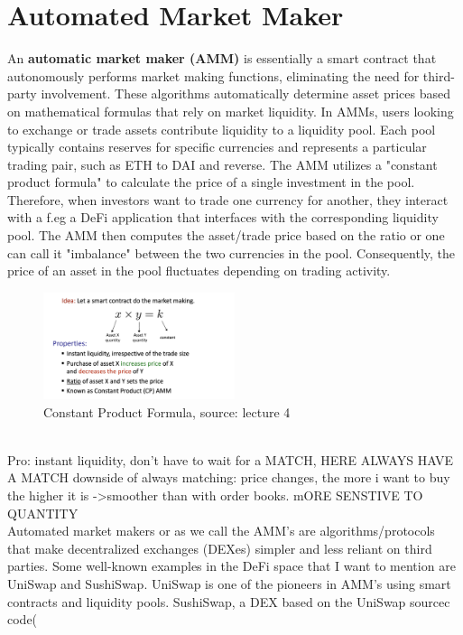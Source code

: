 \documentclass{article}
\begin{document}
\section{Automated Market Maker}
An \textbf{automatic market maker (AMM)} is essentially a smart contract that autonomously performs market making functions, eliminating the need for third-party involvement. These algorithms automatically determine asset prices based on mathematical formulas that rely on market liquidity. In AMMs, users looking to exchange or trade assets contribute liquidity to a liquidity pool. Each pool typically contains reserves for specific currencies and represents a particular trading pair, such as ETH to DAI and reverse. The AMM utilizes a "constant product formula" to calculate the price of a single investment in the pool. Therefore, when investors want to trade one currency for another, they interact with a f.eg a DeFi application that interfaces with the corresponding liquidity pool. The AMM then computes the asset/trade price based on the ratio or one can call it "imbalance" between the two currencies in the pool. Consequently, the price of an asset in the pool fluctuates depending on trading activity.
\\
\begin{figure}[h]
    \centering
    \includegraphics[width=0.5\textwidth]{Bildschirmfoto 2024-04-02 um 15.09.34.png} 
    \caption{Constant Product Formula, \scriptsize{source: lecture 4}}
    \label{fig:DoS-attack}
\end{figure}
\\


Pro: instant liquidity, don't have to wait for a MATCH, HERE ALWAYS HAVE A MATCH
downside of always matching: price changes, the more i want to buy the higher it is ->smoother than with order books. mORE SENSTIVE TO QUANTITY\\

Automated market makers or as we call the AMM's are algorithms/protocols that make decentralized exchanges (DEXes) simpler and less reliant on third parties. Some well-known examples in the DeFi space that I want to mention are UniSwap and SushiSwap. UniSwap is one of the pioneers in AMM's using smart contracts and liquidity pools. SushiSwap, a DEX based on the UniSwap sourcec code(%
\end{document}
